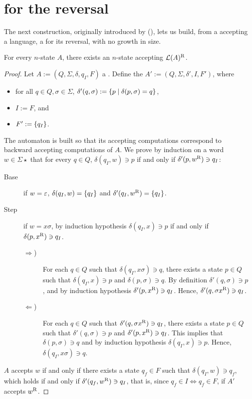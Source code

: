 \section{\texorpdfstring{\ONFA}{1NFA} for the reversal}\label{sub:reversal}
The next construction, originally introduced by \citeauthor{RabSco59} (\cite{RabSco59}), lets us build, from a \ONFA accepting a language, a \ONFA for its reversal, with no growth in size.
\begin{thrm}
	For every $n$-state \ONFA $A$, there exists an $n$-state \ONFA accepting $\mathcal L(A)^{\mathrm R}$.
\end{thrm}
\begin{proof}
	Let $A:=(Q,\Sigma,\delta,q_I,F)$ a \ONFA.
	Define the \ONFA $A':=(Q,\Sigma,\delta',I,F')$, where
	\begin{itemize}
		\item for all $q\in Q,\sigma\in\Sigma$, $\delta'(q,\sigma):=\{p \mid \delta(p,\sigma)=q\}$,
		\item $I:=F$, and
		\item $F':=\{q_I\}$.
	\end{itemize}
	The automaton is built so that its accepting computations correspond to backward accepting computations of $A$.
	We prove by induction on a word $w\in\Sigma\star$ that for every $q\in Q$, $\delta(q_I,w)\ni p$ if and only if $\delta'(p,w^{\mathrm R})\ni q_I$:
	\begin{description}
		\item[Base] if $w=\varepsilon$, $\delta(q_I,w)=\{q_I\}$ and $\delta'(q_I,w^{\mathrm R})=\{q_I\}$.
		\item[Step] if $w=x\sigma$, by induction hypothesis $\delta(q_I,x)\ni p$ if and only if $\delta(p,x^{\mathrm R})\ni q_I$.
		      \begin{description}
			      \item[$\Rightarrow$)] For each $q\in Q$ such that $\delta(q_I,x\sigma)\ni q$, there exists a state $p\in Q$ such that $\delta(q_I,x)\ni p$ and $\delta(p,\sigma)\ni q$.
			            By definition $\delta'(q,\sigma)\ni p$, and by induction hypothesis $\delta'(p,x^{\mathrm R})\ni q_I$. Hence, $\delta'(q,\sigma x^{\mathrm R})\ni q_I$.
			      \item[$\Leftarrow$)] For each $q\in Q$ such that $\delta'(q,\sigma x^{\mathrm R})\ni q_I$, there exists a state $p\in Q$ such that $\delta'(q,\sigma)\ni p$ and $\delta'(p,x^{\mathrm R})\ni q_I$.
			            This implies that $\delta(p,\sigma)\ni q$ and by induction hypothesis $\delta(q_I,x)\ni p$. Hence, $\delta(q_I,x\sigma)\ni q$.
		      \end{description}
	\end{description}
	$A$ accepts $w$ if and only if there exists a state $q_f\in F$ such that $\delta(q_I,w)\ni q_f$, which holds if and only if $\delta'(q_f,w^{\mathrm R})\ni q_I$, that is, since $q_f\in I\iff q_f\in F$, if $A'$ accepts $w^{\mathrm R}$.
\end{proof}
